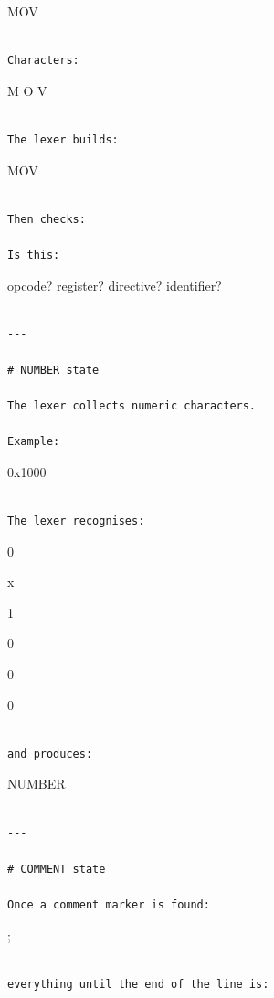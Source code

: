 \documentclass[
  oneside,
  openany]{book}
\begin{document}
MOV

\begin{verbatim}

Characters:
\end{verbatim}

M O V

\begin{verbatim}

The lexer builds:
\end{verbatim}

MOV

\begin{verbatim}

Then checks:

Is this:
\end{verbatim}

opcode? register? directive? identifier?

\begin{verbatim}

---

# NUMBER state

The lexer collects numeric characters.

Example:
\end{verbatim}

0x1000

\begin{verbatim}

The lexer recognises:
\end{verbatim}

0

x

1

0

0

0

\begin{verbatim}

and produces:
\end{verbatim}

NUMBER

\begin{verbatim}

---

# COMMENT state

Once a comment marker is found:
\end{verbatim}

;

\begin{verbatim}

everything until the end of the line is:
\end{verbatim}
\end{document}
